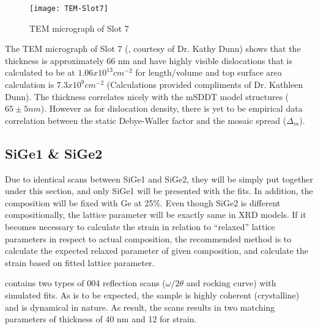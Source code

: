 \begin{figure}[h]
\caption{TEM micrograph of Slot 7}
\label{TEM-Slot7}
\texttt{[image: TEM-Slot7]}
\end{figure}

The TEM micrograph of Slot 7 (, courtesy of Dr. Kathy Dunn)  shows that the thickness is approximately 66 nm and have highly visible dislocations that is calculated to be at $1.06 x 10^{13} cm^{-2}$ for length/volume and top surface area calculation is $7.3 x 10^9 cm^{-2}$ (Calculations provided compliments of Dr. Kathleen Dunn).  The thickness correlates nicely with the mSDDT model structures ($65 \pm 5 nm$).  However as for dislocation density, there is yet to be empirical data correlation between the static Debye-Waller factor and the mosaic spread ($\Delta_m$).


\subsection{SiGe1 \& SiGe2}

Due to identical scans between SiGe1 and SiGe2, they will be simply put together under this section, and only SiGe1 will be presented with the fits.  In addition, the composition will be fixed with Ge at 25\%.  Even though SiGe2 is different compositionally, the lattice parameter will be exactly same in XRD models.  If it becomes necessary to calculate the strain in relation to ``relaxed'' lattice parameters in respect to actual composition, the recommended method is to calculate the expected relaxed parameter of given composition, and calculate the strain based on fitted lattice parameter.

 contains two types of 004 reflection scans ($\omega/2\theta$ and rocking curve) with simulated fits.  As is to be expected, the sample is highly coherent (crystalline) and is dynamical in nature.  As result, the scans results in two matching parameters of thickness of 40 nm and 12 for strain.

